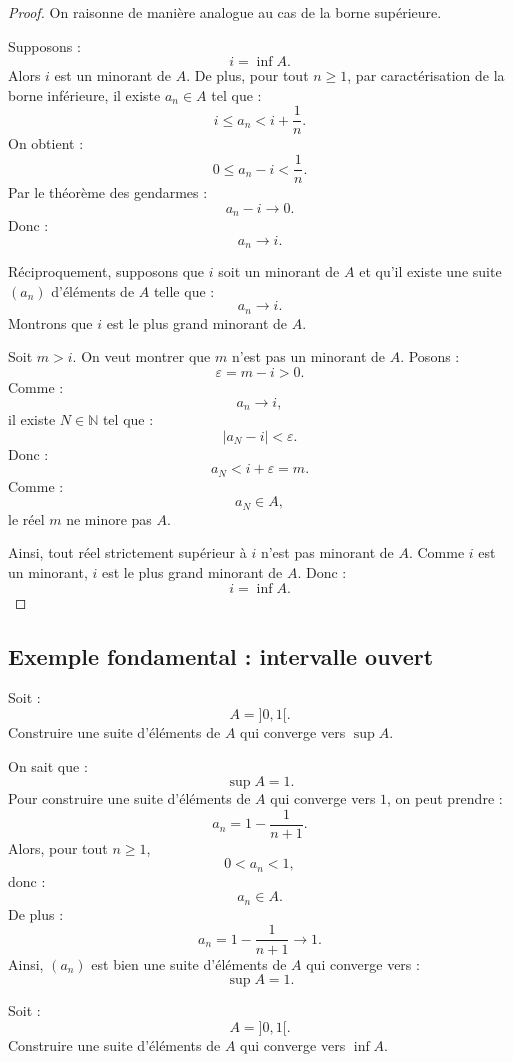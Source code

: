 \documentclass[11pt,a4paper]{article}
\newcommand{\N}{\mathbb N}
\begin{document}
\begin{proof}
On raisonne de manière analogue au cas de la borne supérieure.

Supposons :
\[
i=\inf A.
\]
Alors \(i\) est un minorant de \(A\).  
De plus, pour tout \(n\geq1\), par caractérisation de la borne inférieure, il existe \(a_n\in A\) tel que :
\[
i\leq a_n<i+\frac1n.
\]
On obtient :
\[
0\leq a_n-i<\frac1n.
\]
Par le théorème des gendarmes :
\[
a_n-i\to0.
\]
Donc :
\[
a_n\to i.
\]

Réciproquement, supposons que \(i\) soit un minorant de \(A\) et qu'il existe une suite \((a_n)\) d'éléments de \(A\) telle que :
\[
a_n\to i.
\]
Montrons que \(i\) est le plus grand minorant de \(A\).

Soit \(m>i\).  
On veut montrer que \(m\) n'est pas un minorant de \(A\).  
Posons :
\[
\varepsilon=m-i>0.
\]
Comme :
\[
a_n\to i,
\]
il existe \(N\in\N\) tel que :
\[
|a_N-i|<\varepsilon.
\]
Donc :
\[
a_N<i+\varepsilon=m.
\]
Comme :
\[
a_N\in A,
\]
le réel \(m\) ne minore pas \(A\).

Ainsi, tout réel strictement supérieur à \(i\) n'est pas minorant de \(A\).  
Comme \(i\) est un minorant, \(i\) est le plus grand minorant de \(A\).  
Donc :
\[
i=\inf A.
\]
\end{proof}

\subsection{Exemple fondamental : intervalle ouvert}

\begin{exercicebox}
Soit :
\[
A=]0,1[.
\]
Construire une suite d'éléments de \(A\) qui converge vers \(\sup A\).
\end{exercicebox}

\begin{correctionbox}
On sait que :
\[
\sup A=1.
\]
Pour construire une suite d'éléments de \(A\) qui converge vers \(1\), on peut prendre :
\[
a_n=1-\frac1{n+1}.
\]
Alors, pour tout \(n\geq1\),
\[
0<a_n<1,
\]
donc :
\[
a_n\in A.
\]
De plus :
\[
a_n=1-\frac1{n+1}\longrightarrow1.
\]
Ainsi, \((a_n)\) est bien une suite d'éléments de \(A\) qui converge vers :
\[
\sup A=1.
\]
\end{correctionbox}

\begin{exercicebox}
Soit :
\[
A=]0,1[.
\]
Construire une suite d'éléments de \(A\) qui converge vers \(\inf A\).
\end{exercicebox}
\end{document}
